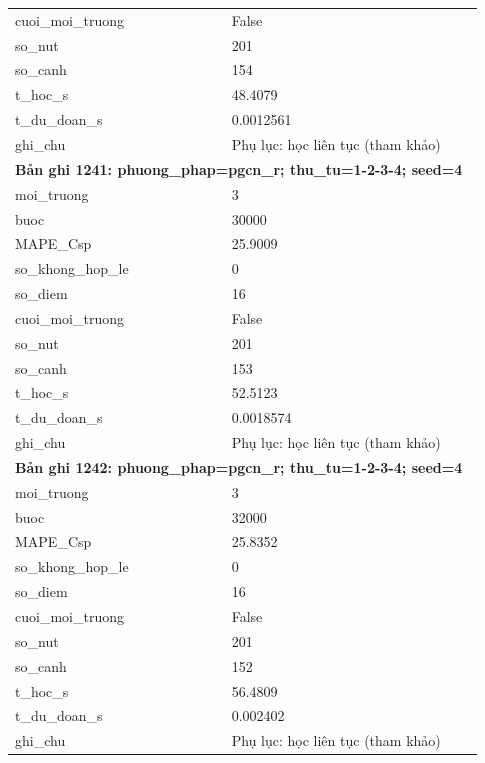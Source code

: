 \begin{longtable}{p{0.43\linewidth}p{0.50\linewidth}}
cuoi\_\allowbreak moi\_\allowbreak truong & False \\
so\_\allowbreak nut & 201 \\
so\_\allowbreak canh & 154 \\
t\_\allowbreak hoc\_\allowbreak s & 48.4079 \\
t\_\allowbreak du\_\allowbreak doan\_\allowbreak s & 0.0012561 \\
ghi\_\allowbreak chu & Phụ lục: học liên tục (tham khảo) \\
\midrule
\multicolumn{2}{p{0.95\linewidth}}{\textbf{Bản ghi 1241: phuong\_phap=pgcn\_r; thu\_tu=1-2-3-4; seed=4}} \\
moi\_\allowbreak truong & 3 \\
buoc & 30000 \\
MAPE\_\allowbreak Csp & 25.9009 \\
so\_\allowbreak khong\_\allowbreak hop\_\allowbreak le & 0 \\
so\_\allowbreak diem & 16 \\
cuoi\_\allowbreak moi\_\allowbreak truong & False \\
so\_\allowbreak nut & 201 \\
so\_\allowbreak canh & 153 \\
t\_\allowbreak hoc\_\allowbreak s & 52.5123 \\
t\_\allowbreak du\_\allowbreak doan\_\allowbreak s & 0.0018574 \\
ghi\_\allowbreak chu & Phụ lục: học liên tục (tham khảo) \\
\midrule
\multicolumn{2}{p{0.95\linewidth}}{\textbf{Bản ghi 1242: phuong\_phap=pgcn\_r; thu\_tu=1-2-3-4; seed=4}} \\
moi\_\allowbreak truong & 3 \\
buoc & 32000 \\
MAPE\_\allowbreak Csp & 25.8352 \\
so\_\allowbreak khong\_\allowbreak hop\_\allowbreak le & 0 \\
so\_\allowbreak diem & 16 \\
cuoi\_\allowbreak moi\_\allowbreak truong & False \\
so\_\allowbreak nut & 201 \\
so\_\allowbreak canh & 152 \\
t\_\allowbreak hoc\_\allowbreak s & 56.4809 \\
t\_\allowbreak du\_\allowbreak doan\_\allowbreak s & 0.002402 \\
ghi\_\allowbreak chu & Phụ lục: học liên tục (tham khảo) \\

\end{longtable}
